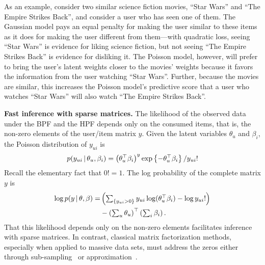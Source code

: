 As an example, consider two similar science fiction movies, ``Star
Wars'' and ``The Empire Strikes Back'', and consider a user who has
seen one of them.  The Gaussian model pays an equal penalty for making
the user similar to these items as it does for making the user
different from them---with quadratic loss, seeing ``Star Wars'' is
evidence for liking science fiction, but not seeing ``The Empire
Strikes Back'' is evidence for disliking it.  The Poisson model,
however, will prefer to bring the user's latent weights closer to the
movies' weights because it favors the information from the user
watching ``Star Wars''. Further, because the movies are similar, this
increases the Poisson model's predictive score that a user who watches
``Star Wars'' will also watch ``The Empire Strikes Back''.

{\bf Fast inference with sparse matrices.}
The likelihood of the observed data under the BPF and the HPF depends
only on the consumed items, that is, the non-zero elements of the
user/item matrix $y$.  Given the latent variables $\theta_u$ and
$\beta_i$, the Poisson distribution of $y_{ui}$ is
\begin{equation}
  p(y_{ui} \,\vert\, \theta_u, \beta_i) =
  \left(\theta_u^\top \beta_i\right)^y
  \exp\left\{-\theta_u^\top \beta_i \right\} / y_{ui}!
\end{equation}
Recall the elementary fact that $0! = 1$.  The log probability of the
complete matrix $y$ is
\begin{align}
  \log p(y \,\vert\, \theta, \beta) =
  & \left(\textstyle \sum_{\{y_{ui} > 0\}}
    y_{ui} \log (\theta_u^\top \beta_i) - \log y_{ui}!
  \right) \\
  & -
  \left(\textstyle\sum_{u} \theta_u\right)^\top \left(\textstyle
    \sum_{i} \beta_i\right).
\end{align}
That this likelihood depends only on the non-zero elements facilitates
inference with sparse matrices.  In contrast, classical matrix
factorization methods, especially when applied to
massive data sets, must address the zeros either through
sub-sampling~\cite{Dror:2012a} or approximation~\cite{Hu:2008p9402}.


